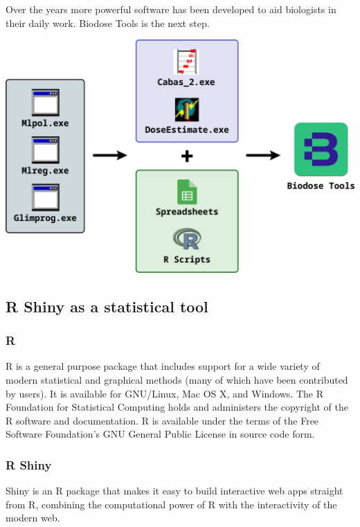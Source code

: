 \documentclass[]{scrartcl}
\begin{document}
Over the years more powerful software has been developed to aid biologists in their daily work. Biodose Tools is the next step.

\includegraphics{images/intro/chronology.pdf}

\hypertarget{r-shiny-as-a-statistical-tool}{%
\subsection*{R Shiny as a statistical tool}\label{r-shiny-as-a-statistical-tool}}

\hypertarget{r}{%
\subsubsection*{R}\label{r}}

R is a general purpose package that includes support for a wide variety of modern
statistical and graphical methods (many of which have been contributed by users). It is available for GNU/Linux, Mac OS X, and Windows. The R Foundation for Statistical Computing holds and administers the copyright of the R software and documentation. R is available under the terms of the Free Software Foundation's GNU General Public License in source code form.

\hypertarget{r-shiny}{%
\subsubsection*{R Shiny}\label{r-shiny}}

Shiny is an R package that makes it easy to build interactive web apps straight from R, combining the computational power of R with the interactivity of the modern web.
\end{document}
